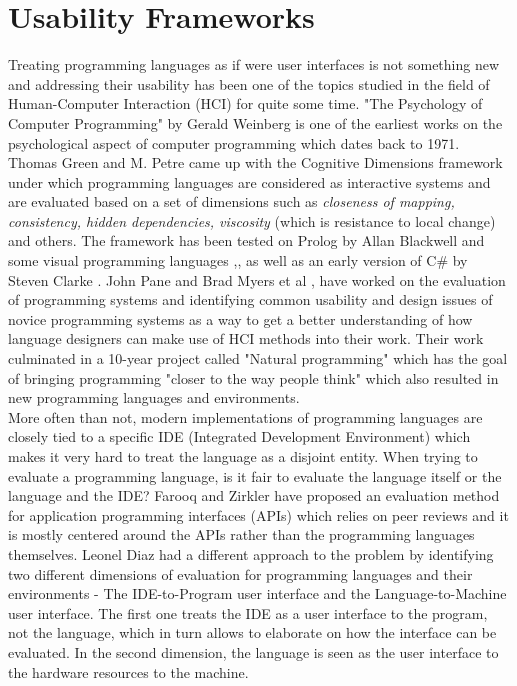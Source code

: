\section{Usability Frameworks}
Treating programming languages as if were user interfaces is not something new and addressing their usability has been one of the topics studied in the field of Human-Computer Interaction (HCI) for quite some time. "The Psychology of Computer Programming" by Gerald Weinberg \cite{GWeinberg} is one of the earliest works on the psychological aspect of computer programming which dates back to 1971. Thomas Green and M. Petre \cite{CognitiveDimensions} came up with the Cognitive Dimensions framework under which programming languages are considered as interactive systems and are evaluated based on a set of dimensions such as \textit{closeness of mapping, consistency, hidden dependencies, viscosity} (which is resistance to local change) and others. The framework has been tested on Prolog by Allan Blackwell \cite{CognitiveDimensions2} and some visual programming languages \cite{InstructsDescripts},\cite{InformationArtefacts},\cite{CognitiveDimensions} as well as an early version of C\# by Steven Clarke \cite{NewLangEval}. John Pane and Brad Myers et al \cite{NaturalProgramming}, have worked on the evaluation of programming systems and identifying common usability and design issues of novice programming systems as a way to get a better understanding of how language designers can make use of HCI methods into their work. Their work culminated in a 10-year project called "Natural programming" which has the goal of bringing programming "closer to the way people think" which also resulted in new programming languages and environments. 
\\More often than not, modern implementations of programming languages are closely tied to a specific IDE (Integrated Development Environment) which makes it very hard to treat the language as a disjoint entity. When trying to evaluate a programming language, is it fair to evaluate the language itself or the language and the IDE? Farooq and Zirkler \cite{APPPeer} have proposed an evaluation method for application programming interfaces (APIs) which relies on peer reviews and it is mostly centered around the APIs rather than the programming languages themselves. Leonel Diaz \cite{LangsasUI} had a different approach to the problem by identifying two different dimensions of evaluation for programming languages and their environments -  The IDE-to-Program user interface and the Language-to-Machine user interface. The first one treats the IDE as a user interface to the program, not the language, which in turn allows to elaborate on how the interface can be evaluated. In the second dimension, the language is seen as the user interface to the hardware resources to the machine.		

